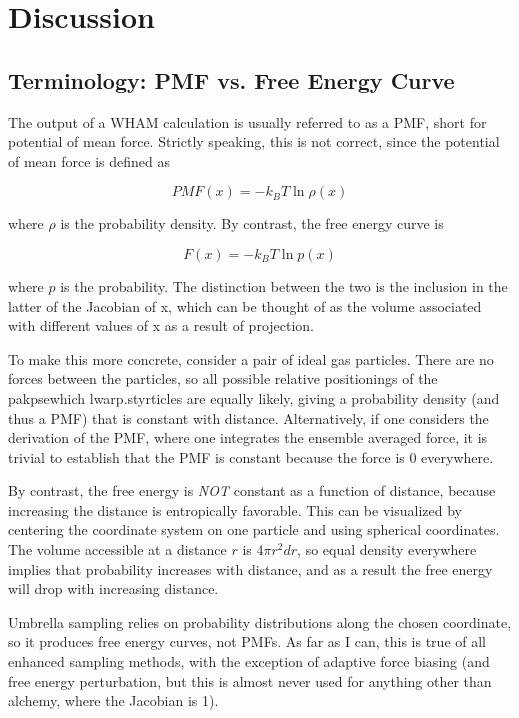 \documentclass[12pt]{article}
\begin{document}
\section{Discussion}

\subsection{Terminology: PMF vs. Free Energy Curve}

The output of a WHAM calculation is usually referred to as a PMF, short for
potential of mean force. Strictly speaking, this is not correct, since the
potential of mean force is defined as

\begin{equation}
    PMF(x) = -k_B T \ln \rho(x)
\end{equation}

\noindent
where $\rho$ is the probability density. By contrast, the free energy curve is

\begin{equation}
    F(x) = -k_B T \ln p(x)
\end{equation}

\noindent
where $p$ is the probability. The distinction between the two is the inclusion
in the latter of the Jacobian of x, which can be thought of as the volume
associated with different values of x as a result of projection.

To make this more concrete, consider a pair of ideal gas particles. There are no
forces between the particles, so all possible relative positionings of the
pakpsewhich lwarp.styrticles are equally likely, giving a probability density (and thus a PMF) that
is constant with distance. Alternatively, if one considers the derivation of the
PMF, where one integrates the ensemble averaged force, it is trivial to
establish that the PMF is constant because the force is 0 everywhere.

By contrast, the free energy is \emph{NOT} constant as a function of distance,
because increasing the distance is entropically favorable. This can be
visualized by centering the coordinate system on one particle and using
spherical coordinates. The volume accessible at a distance $r$ is $4 \pi r^2
dr$, so equal density everywhere implies that probability increases with
distance, and as a result the free energy will drop with increasing distance.

Umbrella sampling relies on probability distributions along the chosen
coordinate, so it produces free energy curves, not PMFs. As far as I can, this
is true of all enhanced sampling methods, with the exception of adaptive force
biasing (and free energy perturbation, but this is almost never used for
anything other than alchemy, where the Jacobian is 1).
\end{document}
